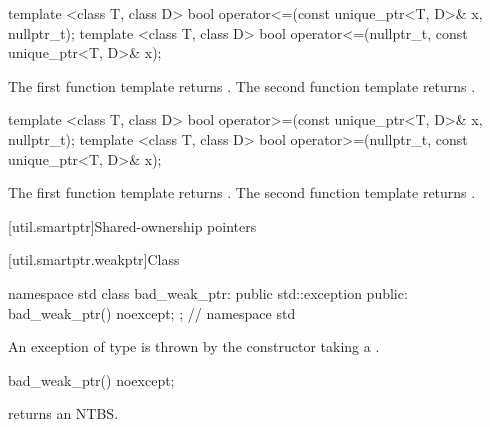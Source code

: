 %
%
\begin{itemdecl}
template <class T, class D>
  bool operator<=(const unique_ptr<T, D>& x, nullptr_t);
template <class T, class D>
  bool operator<=(nullptr_t, const unique_ptr<T, D>& x);
\end{itemdecl}

\begin{itemdescr}
\pnum
\returns
The first function template returns .
The second function template returns .
\end{itemdescr}

%
%
\begin{itemdecl}
template <class T, class D>
  bool operator>=(const unique_ptr<T, D>& x, nullptr_t);
template <class T, class D>
  bool operator>=(nullptr_t, const unique_ptr<T, D>& x);
\end{itemdecl}

\begin{itemdescr}
\pnum
\returns
The first function template returns .
The second function template returns .
\end{itemdescr}

%
[util.smartptr]{Shared-ownership pointers}

[util.smartptr.weakptr]{Class }
%
%
\begin{codeblock}
namespace std {
  class bad_weak_ptr: public std::exception {
  public:
    bad_weak_ptr() noexcept;
  };
} // namespace std
\end{codeblock}

\pnum
An exception of type  is thrown by the 
constructor taking a .

%
%
%
\begin{itemdecl}
bad_weak_ptr() noexcept;
\end{itemdecl}

\begin{itemdescr}
\pnum\postconditions  {} returns an
 NTBS.

\end{itemdescr}

